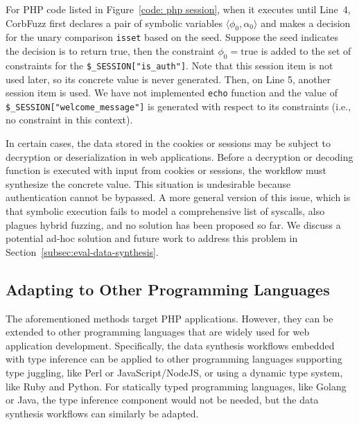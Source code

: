 \documentclass[10pt,conference]{IEEEtran}
\begin{document}
For PHP code listed in Figure~\ref{code: php session}, when it executes until Line~4, CorbFuzz first declares a pair of symbolic variables $\langle\phi_{0}, \alpha_{0}\rangle$ and makes a decision for the unary comparison \verb|isset| based on the seed. Suppose the seed indicates the decision is to return true, then the constraint $\phi_0 = \text{true}$ is added to the set of constraints for the \verb|$_SESSION["is_auth"]|. Note that this session item is not used later, so its concrete value is never generated. Then, on Line 5, another session item is used. We have not implemented \verb|echo| function and the value of \verb|$_SESSION["welcome_message"]| is generated with respect to its constraints (i.e., no constraint in this context).

In certain cases, the data stored in the cookies or sessions may be subject to decryption or deserialization in web applications. Before a decryption or decoding function is executed with input from cookies or sessions, the workflow must synthesize the concrete value. This situation is undesirable because authentication cannot be bypassed. A more general version of this issue, which is that symbolic execution fails to model a comprehensive list of syscalls, also plagues hybrid fuzzing\cite{Driller}, and no solution has been proposed so far. We discuss a potential ad-hoc solution and future work to address this problem in Section~\ref{subsec:eval-data-synthesis}.


\subsection{Adapting to Other Programming Languages}

The aforementioned methods target PHP applications. However, they can be extended to other programming languages that are widely used for web application development. Specifically, the data synthesis workflows embedded with type inference can be applied to other programming languages supporting type juggling, like Perl or JavaScript/NodeJS, or using a dynamic type system, like Ruby and Python. For statically typed programming languages, like Golang or Java, the type inference component would not be needed, but the data synthesis workflows can similarly be adapted. 

\end{document}
